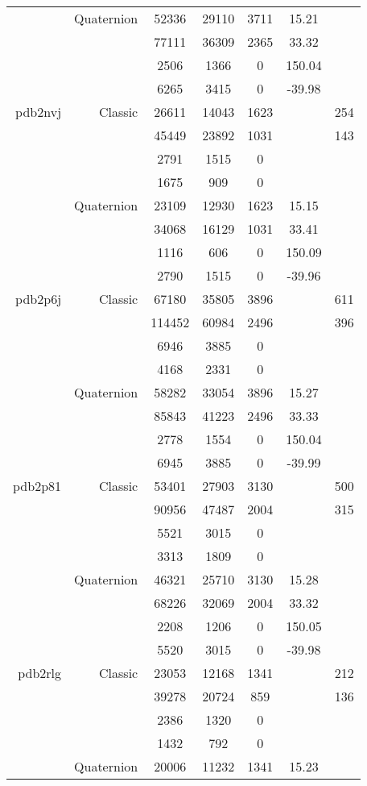 \begin{xltabular}{\textwidth}{r|rcccSc}
& Quaternion & 52336 & 29110 & 3711 & 15.21 & \\
& & 77111 & 36309 & 2365 & 33.32 & \\
& & 2506 & 1366 & 0 & 150.04 & \\
& & 6265 & 3415 & 0 & -39.98 & \\ \addlinespace
pdb2nvj & Classic & 26611 & 14043 & 1623 & & 254 \\
& & 45449 & 23892 & 1031 & & 143 \\
& & 2791 & 1515 & 0 & & \\
& & 1675 & 909 & 0 & & \\
& Quaternion & 23109 & 12930 & 1623 & 15.15 & \\
& & 34068 & 16129 & 1031 & 33.41 & \\
& & 1116 & 606 & 0 & 150.09 & \\
& & 2790 & 1515 & 0 & -39.96 & \\ \addlinespace
pdb2p6j & Classic & 67180 & 35805 & 3896 & & 611 \\
& & 114452 & 60984 & 2496 & & 396 \\
& & 6946 & 3885 & 0 & & \\
& & 4168 & 2331 & 0 & & \\
& Quaternion & 58282 & 33054 & 3896 & 15.27 & \\
& & 85843 & 41223 & 2496 & 33.33 & \\
& & 2778 & 1554 & 0 & 150.04 & \\
& & 6945 & 3885 & 0 & -39.99 & \\ \addlinespace
pdb2p81 & Classic & 53401 & 27903 & 3130 & & 500 \\
& & 90956 & 47487 & 2004 & & 315 \\
& & 5521 & 3015 & 0 & & \\
& & 3313 & 1809 & 0 & & \\
& Quaternion & 46321 & 25710 & 3130 & 15.28 & \\
& & 68226 & 32069 & 2004 & 33.32 & \\
& & 2208 & 1206 & 0 & 150.05 & \\
& & 5520 & 3015 & 0 & -39.98 & \\ \addlinespace
pdb2rlg & Classic & 23053 & 12168 & 1341 & & 212 \\
& & 39278 & 20724 & 859 & & 136 \\
& & 2386 & 1320 & 0 & & \\
& & 1432 & 792 & 0 & & \\
& Quaternion & 20006 & 11232 & 1341 & 15.23 & \\

\end{xltabular}
